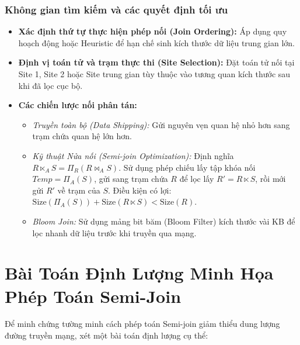 \documentclass[12pt,a4paper]{report}
\begin{document}
\subsubsection{Không gian tìm kiếm và các quyết định tối ưu}
\begin{itemize}[leftmargin=0.8cm, topsep=1pt, itemsep=1pt]
    \item \textbf{Xác định thứ tự thực hiện phép nối (Join Ordering):} Áp dụng quy hoạch động hoặc Heuristic để hạn chế sinh kích thước dữ liệu trung gian lớn.
    \item \textbf{Định vị toán tử và trạm thực thi (Site Selection):} Đặt toán tử nối tại Site 1, Site 2 hoặc Site trung gian tùy thuộc vào tương quan kích thước sau khi đã lọc cục bộ.
    \item \textbf{Các chiến lược nối phân tán:}
    \begin{itemize}
        \item \textit{Truyền toàn bộ (Data Shipping):} Gửi nguyên vẹn quan hệ nhỏ hơn sang trạm chứa quan hệ lớn hơn.
        \item \textit{Kỹ thuật Nửa nối (Semi-join Optimization):} Định nghĩa $R \ltimes_A S = \Pi_R (R \bowtie_A S)$. Sử dụng phép chiếu lấy tập khóa nối $Temp = \Pi_A(S)$, gửi sang trạm chứa $R$ để lọc lấy $R' = R \ltimes S$, rồi mới gửi $R'$ về trạm của $S$. Điều kiện có lợi: $\text{Size}(\Pi_A(S)) + \text{Size}(R \ltimes S) < \text{Size}(R)$.
        \item \textit{Bloom Join:} Sử dụng mảng bit băm (Bloom Filter) kích thước vài KB để lọc nhanh dữ liệu trước khi truyền qua mạng.
    \end{itemize}
\end{itemize}

\section{Bài Toán Định Lượng Minh Họa Phép Toán Semi-Join}
Để minh chứng tường minh cách phép toán Semi-join giảm thiểu dung lượng đường truyền mạng, xét một bài toán định lượng cụ thể:
\end{document}
